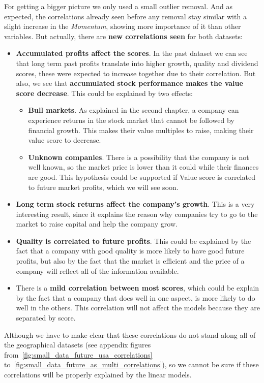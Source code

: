 \documentclass[11pt,english,a4paper,hidelinks]{book}
\begin{document}
\noindent For getting a bigger picture we only used a small outlier removal. And as expected, the correlations already seen before any removal stay similar with a slight increase in the \textit{Momentum}, showing more importance of it than other variables. But actually, there are \textbf{new correlations seen} for both datasets:

\begin{itemize}
    \item  \textbf{Accumulated profits affect the scores}. In the past dataset we can see that long term past profits translate into higher growth, quality and dividend scores, these were expected to increase together due to their correlation. But also, we see that \textbf{accumulated stock performance makes the value score decrease}. This could be explained by two effects:
    \begin{itemize}
        \item \textbf{Bull markets}. As explained in the second chapter, a company can experience returns in the stock market that cannot be followed by financial growth. This makes their value multiples to raise, making their value score to decrease.
        \item \textbf{Unknown companies}. There is a possibility that the company is not well known, so the market price is lower than it could while their finances are good. This hypothesis could be supported if Value score is correlated to future market profits, which we will see soon.
    \end{itemize}
    \item \textbf{Long term stock returns affect the company's growth}. This is a very interesting result, since it explains the reason why companies try to go to the market to raise capital and help the company grow.
    \item \textbf{Quality is correlated to future profits}. This could be explained by the fact that a company with good quality is more likely to have good future profits, but also by the fact that the market is efficient and the price of a company will reflect all of the information available.
    \item There is a \textbf{mild correlation between most scores}, which could be explain by the fact that a company that does well in one aspect, is more likely to do well in the others. This correlation will not affect the models because they are separated by score.
\end{itemize}

\noindent Although we have to make clear that these correlations do not stand along all of the geographical datasets (see appendix figures from~\ref{fig:small_data_future_usa_correlations} to~\ref{fig:small_data_future_as_multi_correlations}), so we cannot be sure if these correlations will be properly explained by the linear models.
\end{document}
